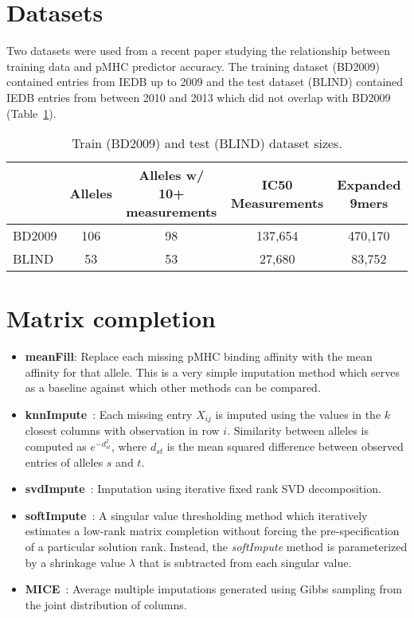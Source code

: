 \section*{Datasets}

Two datasets were used from a recent paper studying the relationship between training data and pMHC predictor accuracy\cite{Kim_2014}. The training dataset (BD2009) contained entries from IEDB\cite{Salimi_2012} up to 2009 and the test dataset (BLIND) contained IEDB entries from between 2010 and 2013 which did not overlap with BD2009 (Table~\ref{tab:datasets}).

\begin{table}[h!]
\label{tab:datasets}

\begin{tabular}{l||cccc}
\toprule
{} & Alleles & Alleles w/ 10+ measurements & IC50 Measurements & Expanded 9mers \\
\midrule
BD2009 &     106 &                          98 &           137,654 &        470,170 \\
BLIND  &      53 &                          53 &            27,680 &         83,752 \\
\bottomrule
\end{tabular}

\caption{Train (BD2009) and test (BLIND) dataset sizes.}
\end{table}



\section*{Matrix completion}

\begin{itemize}
\item {\bf meanFill}: Replace each missing pMHC binding affinity with the mean affinity for that allele. This is a very simple imputation method which serves as a baseline against which other methods can be compared. 

\item {\bf knnImpute}~\cite{Troyanskaya_2001}: Each missing entry $X_{ij}$ is imputed using the values in the $k$ closest columns with observation in row $i$.  Similarity between alleles is computed as $e^{-d_{st}^2}$, where $d_{st}$ is the mean squared difference between observed entries of alleles $s$ and $t$. 

\item {\bf svdImpute}~\cite{Troyanskaya_2001}: Imputation using iterative fixed rank SVD decomposition. 

\item {\bf softImpute}~\cite{Mazumder2010SpectralMatrices}: A singular value thresholding method which iteratively estimates a low-rank matrix completion without forcing the pre-specification of a particular solution rank. Instead, the {\it softImpute} method is parameterized by a shrinkage value $\lambda$ that is subtracted from each singular value. 

\item {\bf MICE}~\cite{Azur_2011}: Average multiple imputations generated using Gibbs sampling from the joint distribution of columns. 
\end{itemize}

